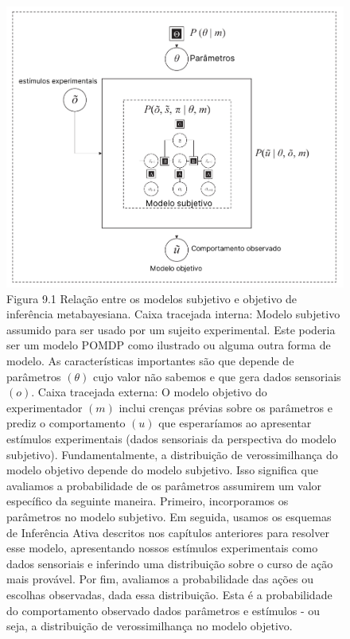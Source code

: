\documentclass[
  12pt,
]{book}
\begin{document}
\begin{figure}
\centering
\includegraphics{images/Figura_9_1.png}
\caption{Figura 9.1 Relação entre os modelos subjetivo e objetivo de inferência metabayesiana. Caixa tracejada interna: Modelo subjetivo assumido para ser usado por um sujeito experimental. Este poderia ser um modelo POMDP como ilustrado ou alguma outra forma de modelo. As características importantes são que depende de parâmetros \((\theta)\) cujo valor não sabemos e que gera dados sensoriais \((o)\). Caixa tracejada externa: O modelo objetivo do experimentador \((m)\) inclui crenças prévias sobre os parâmetros e prediz o comportamento \((u)\) que esperaríamos ao apresentar estímulos experimentais (dados sensoriais da perspectiva do modelo subjetivo). Fundamentalmente, a distribuição de verossimilhança do modelo objetivo depende do modelo subjetivo. Isso significa que avaliamos a probabilidade de os parâmetros assumirem um valor específico da seguinte maneira. Primeiro, incorporamos os parâmetros no modelo subjetivo. Em seguida, usamos os esquemas de Inferência Ativa descritos nos capítulos anteriores para resolver esse modelo, apresentando nossos estímulos experimentais como dados sensoriais e inferindo uma distribuição sobre o curso de ação mais provável. Por fim, avaliamos a probabilidade das ações ou escolhas observadas, dada essa distribuição. Esta é a probabilidade do comportamento observado dados parâmetros e estímulos - ou seja, a distribuição de verossimilhança no modelo objetivo.}
\end{figure}
\end{document}
